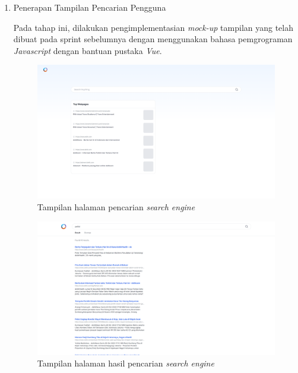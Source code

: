\begin{enumerate}[label=\alph*)., leftmargin=1\parindent]
	\item{Penerapan Tampilan Pencarian Pengguna}
	
	Pada tahap ini, dilakukan pengimplementasian \textit{mock-up} tampilan yang telah dibuat pada sprint sebelumnya dengan menggunakan bahasa pemgrograman \textit{Javascript} dengan bantuan pustaka \textit{Vue}.
	
	\begin{figure}[H]
		\centering
		\includegraphics[keepaspectratio, width=13cm]{gambar/view_search_engine_home.png}
		\caption{Tampilan halaman pencarian \textit{search engine}}
		\label{gambar:view_search_engine_home.png}
	\end{figure}
	
	
	\begin{figure}[H]
		\centering
		\includegraphics[keepaspectratio, width=13cm]{gambar/view_search_engine_result.png}
		\caption{Tampilan halaman hasil pencarian \textit{search engine}}
		\label{gambar:view_search_engine_result.png}
	\end{figure}
	

\end{enumerate}
